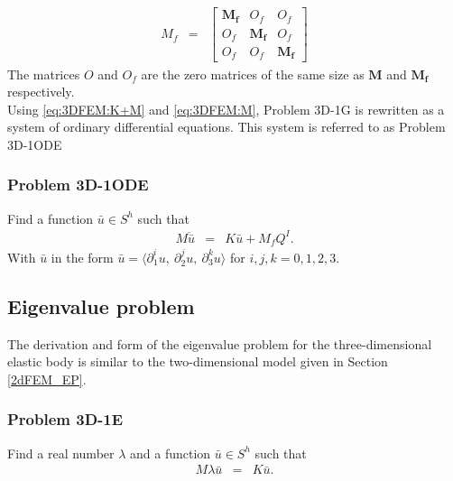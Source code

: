 \documentclass[../../main.tex]{subfiles}
\begin{document}
\begin{eqnarray}
	M_f & = &
	\begin{bmatrix}
		\mathbf{M_f} & {O_f} & {O_f}\\
		{O_f} & \mathbf{M_f} & {O_f}\\
		{O_f} & {O_f} & \mathbf{M_f}
	\end{bmatrix}\label{eq:3DFEM:M}
\end{eqnarray}
The matrices ${O}$ and ${O_f}$ are the zero matrices of the same size as $\mathbf{M}$ and $\mathbf{M_f}$ respectively.\\

Using \eqref{eq:3DFEM:K+M} and \eqref{eq:3DFEM:M}, Problem 3D-1G is rewritten as a system of ordinary differential equations. This system is referred to as Problem 3D-1ODE

\subsubsection{Problem 3D-1ODE}
Find a function $\bar{u} \in S^h$ such that
\begin{eqnarray}
	M\ddot{\bar{u}} & = & K\bar{u} + M_{f}Q^I. \label{3D_M}
\end{eqnarray} With $\bar{u}$ in the form $\bar{u} = \langle \partial^i_1u, \ \partial^j_2u, \ \partial^k_3u \rangle$ for $i,j,k = 0,1,2,3$.

\subsection{Eigenvalue problem}
The derivation and form of the eigenvalue problem for the three-dimensional elastic body is similar to the two-dimensional model given in Section \ref{2dFEM_EP}.

\subsubsection{Problem 3D-1E}\label{3dFEM_EP}
Find a real number $\lambda$ and a function $\bar{u} \in S^h$ such that
\begin{eqnarray}
	M\lambda{\bar{u}} & = & K\bar{u}.
\end{eqnarray}
\end{document}
